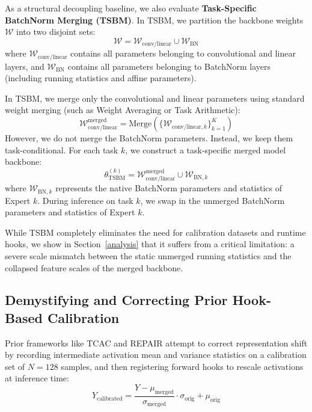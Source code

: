 \documentclass{article}
\theoremstyle{plain}
\theoremstyle{definition}
\theoremstyle{remark}
\begin{document}
As a structural decoupling baseline, we also evaluate \textbf{Task-Specific BatchNorm Merging (TSBM)}. In TSBM, we partition the backbone weights $\mathcal{W}$ into two disjoint sets:
\begin{equation}
    \mathcal{W} = \mathcal{W}_{\text{conv/linear}} \cup \mathcal{W}_{\text{BN}}
\end{equation}
where $\mathcal{W}_{\text{conv/linear}}$ contains all parameters belonging to convolutional and linear layers, and $\mathcal{W}_{\text{BN}}$ contains all parameters belonging to BatchNorm layers (including running statistics and affine parameters).

In TSBM, we merge only the convolutional and linear parameters using standard weight merging (such as Weight Averaging or Task Arithmetic):
\begin{equation}
    \mathcal{W}_{\text{conv/linear}}^{\text{merged}} = \text{Merge}(\{\mathcal{W}_{\text{conv/linear}, k}\}_{k=1}^K)
\end{equation}
However, we do not merge the BatchNorm parameters. Instead, we keep them task-conditional. For each task $k$, we construct a task-specific merged model backbone:
\begin{equation}
    \theta_{\text{TSBM}}^{(k)} = \mathcal{W}_{\text{conv/linear}}^{\text{merged}} \cup \mathcal{W}_{\text{BN}, k}
\end{equation}
where $\mathcal{W}_{\text{BN}, k}$ represents the native BatchNorm parameters and statistics of Expert $k$. During inference on task $k$, we swap in the unmerged BatchNorm parameters and statistics of Expert $k$. 

While TSBM completely eliminates the need for calibration datasets and runtime hooks, we show in Section~\ref{analysis} that it suffers from a critical limitation: a severe scale mismatch between the static unmerged running statistics and the collapsed feature scales of the merged backbone.

\subsection{Demystifying and Correcting Prior Hook-Based Calibration}

Prior frameworks like TCAC and REPAIR attempt to correct representation shift by recording intermediate activation mean and variance statistics on a calibration set of $N=128$ samples, and then registering forward hooks to rescale activations at inference time:
\begin{equation}
    Y_{\text{calibrated}} = \frac{Y - \mu_{\text{merged}}}{\sigma_{\text{merged}}} \cdot \sigma_{\text{orig}} + \mu_{\text{orig}}
\end{equation}
\end{document}
